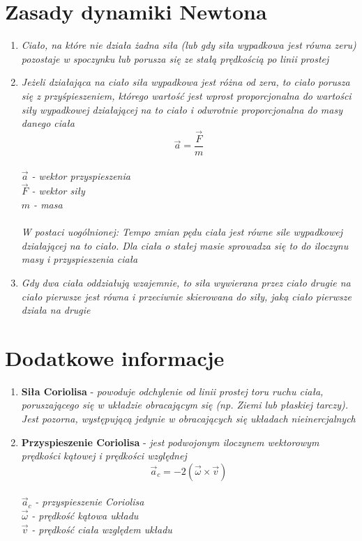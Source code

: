 \documentclass[12pt,twoside,a4paper]{book}
\begin{document}
\section{Zasady dynamiki Newtona}
\begin{enumerate}[label=(\Roman*)]
\item\textit{Ciało, na które nie działa żadna siła (lub gdy siła wypadkowa jest równa zeru)
pozostaje w spoczynku lub porusza się ze stałą prędkością po linii prostej}
\item\textit{Jeżeli działająca na ciało siła wypadkowa jest różna od zera, to ciało porusza się z przyśpieszeniem, którego wartość jest wprost proporcjonalna do wartości siły wypadkowej działającej na to ciało i odwrotnie proporcjonalna do masy danego ciała\\
$$\vec a=\frac{\vec F}{m}$$\\
$\vec a$ - wektor przyspieszenia\\
$\vec F$ - wektor siły\\
$m$ - masa\\
\\W postaci uogólnionej: Tempo zmian pędu ciała jest równe sile wypadkowej działającej na to ciało. Dla
ciała o stałej masie sprowadza się to do iloczynu masy i przyspieszenia ciała}
\item\textit{Gdy dwa ciała oddziałują wzajemnie, to siła wywierana przez ciało drugie na ciało
pierwsze jest równa i przeciwnie skierowana do siły, jaką ciało pierwsze działa na
drugie}
\end{enumerate}
\section{Dodatkowe informacje}
\begin{enumerate}[label=(\alph*)]
\item\textbf{Siła Coriolisa} - \textit{powoduje odchylenie od linii prostej toru ruchu ciała, poruszającego się w układzie obracającym się (np. Ziemi lub płaskiej tarczy). Jest pozorna, występującą jedynie w obracających się układach nieinercjalnych}
\item\textbf{Przyspieszenie Coriolisa} - \textit{jest podwojonym iloczynem wektorowym prędkości kątowej i prędkości względnej}\\
$$\vec a_c = -2(\vec{\omega} \times \vec{v})$$\\
$\vec a_c$ \textit{- przyspieszenie Coriolisa}\\
$\vec{\omega}$ \textit{- prędkość kątowa układu}\\
$\vec{v}$ \textit{- prędkość ciała względem układu}\\

\end{enumerate}
\end{document}
